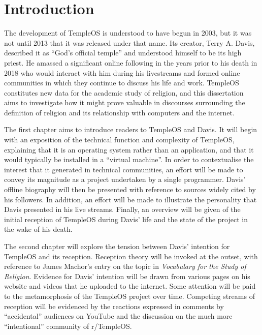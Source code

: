 \documentclass[Draft.tex]{subfiles}
\begin{document}
\chapter*{Introduction}

The development of TempleOS is understood to have begun in 2003,
but it was not until 2013 that it was released under that name.
Its creator, Terry A. Davis, described it as ``God's official temple''
and understood himself to be its high priest.
He amassed a significant online following
in the years prior to his death in 2018
who would interact with him during his livestreams
and formed online communities
in which they continue to discuss his life and work.
TempleOS constitutes new data for the academic study of religion,
and this dissertation aims to investigate how it might prove valuable
in discourses surrounding the definition of religion
and its relationship with computers and the internet.

The first chapter aims to introduce readers to TempleOS and Davis.
It will begin with an exposition of the technical function
and complexity of TempleOS,
explaining that it is an operating system rather than an application,
and that it would typically be installed in a ``virtual machine''.
In order to contextualise the interest that it generated
in technical communities, an effort will be made to convey
its magnitude as a project undertaken by a single programmer.
Davis' offline biography will then be presented
with reference to sources widely cited by his followers.
In addition, an effort will be made to illustrate
the personality that Davis presented in his live streams.
Finally, an overview will be given of the initial reception of TempleOS
during Davis' life and the state of the project in the wake of his death.

The second chapter will explore the tension between
Davis' intention for TempleOS and its reception.
Reception theory will be invoked at the outset,
with reference to James Machor's entry on the topic in
\textit{Vocabulary for the Study of Religion}.
Evidence for Davis' intention will be drawn from
various pages on his website and videos that he uploaded to the internet.
Some attention will be paid to
the metamorphosis of the TempleOS project over time.
Competing streams of reception will be evidenced
by the reactions expressed in comments by ``accidental'' audiences on YouTube
and the discussion on the much more ``intentional'' community of r/TempleOS.
\end{document}
